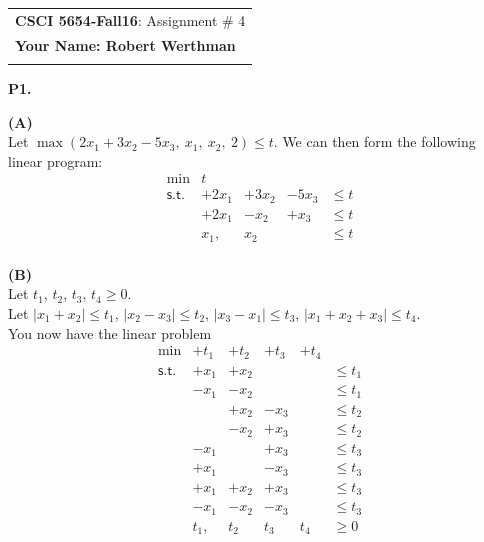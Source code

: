 \documentclass[11pt]{article}
\begin{document}

\begin{tabular}{l}
	\textbf{CSCI 5654-Fall16}: Assignment \# 4 \\
	\textbf{Your Name: Robert Werthman} \phantom{Supercalifragilisticexpialidocius Smith} \\
	\hline \\[10pt]
\end{tabular}

\noindent\textbf{P1.}
\bigskip

\noindent\textbf{(A)}
\\
Let $\max( 2 x_1 + 3 x_2 - 5 x_3,\ x_1,\ x_2,\ 2) \leq t$.  We can then form the following linear program:
\[\begin{array}{rllllll}
\min & t \\
\mathsf{s.t.} 
& +2x_1 & +3x_2 & -5x_3 & \leq t \\
& +2x_1 & -x_2 & +x_3 & \leq t \\
& x_1, & x_2 & & \leq t \\
\end{array}\]

\medskip 

\noindent\textbf{(B)}
\\
Let $t_1$, $t_2$, $t_3$, $t_4 \geq 0$. \\
Let $|x_1 + x_2| \leq t_1$, $| x_2 - x_3 | \leq t_2$, $| x_3 - x_1 | \leq t_3$, $| x_1 + x_2 + x_3 | \leq t_4$.\\
You now have the linear problem
\[\begin{array}{rllllll}
\min & +t_1 & +t_2 & +t_3 & +t_4 \\
\mathsf{s.t.} 
& +x_1 & +x_2 & & & \leq t_1 \\
& -x_1 & -x_2 & & & \leq t_1 \\
& & +x_2 & -x_3 & & \leq t_2 \\
& & -x_2 & +x_3 & & \leq t_2 \\
& -x_1 & & +x_3 & & \leq t_3 \\
& +x_1 & & -x_3 & & \leq t_3 \\
& +x_1 & +x_2 & +x_3 & & \leq t_3 \\
& -x_1 & -x_2 & -x_3 & & \leq t_3 \\
& t_1, & t_2 & t_3 & t_4 & \geq 0 \\
\end{array}\]
\end{document}
